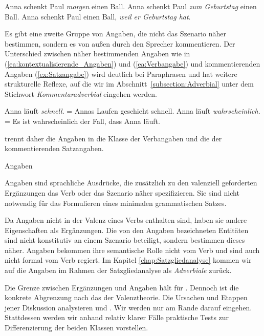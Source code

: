 \ea \label{ea:kontextualisierende_Angaben}
\ea \label{ea:Adverb} Anna schenkt Paul \textit{morgen} einen Ball.
\ex \label{ex:PP} Anna schenkt Paul \textit{zum Geburtstag} einen Ball.
\ex \label{ex:NeSa} Anna schenkt Paul einen Ball, \textit{weil er Geburtstag hat}.
\z 
\z 

Es gibt eine zweite Gruppe von Angaben, die nicht das Szenario näher bestimmen, sondern es von außen durch den Sprecher kommentieren. Der Unterschied zwischen näher bestimmenden Angaben wie in (\ref{ea:kontextualisierende_Angaben}) und (\ref{ea:Verbangabe}) und kommentierenden Angaben (\ref{ex:Satzangabe}) wird deutlich bei Paraphrasen und hat weitere strukturelle Reflexe, auf die wir im Abschnitt~\ref{subsection:Adverbial} unter dem Stichwort \textit{Kommentaradverbial} eingehen werden.  

\ea
\ea \label{ea:Verbangabe} Anna läuft \textit{schnell}. = Annas Laufen geschieht schnell.
\ex \label{ex:Satzangabe} Anna läuft \textit{wahrscheinlich}. = Es ist wahrscheinlich der Fall, dass Anna läuft. 
\z
\z 

\citet[222--223]{Eroms2000} trennt daher die Angaben in die Klasse der Verbangaben und die der kommentierenden Satzangaben. 


\begin{Definition}{Angaben}
    
\noindent Angaben sind sprachliche Ausdrücke, die zusätzlich zu den valenziell geforderten Ergänzungen das Verb oder das Szenario näher spezifizieren. Sie sind nicht notwendig für das Formulieren eines minimalen grammatischen Satzes. 
\end{Definition}



Da Angaben nicht in der Valenz eines Verbs enthalten sind, haben sie andere Eigenschaften als Ergänzungen. Die von den Angaben bezeichneten Entitäten sind nicht konstitutiv an einem Szenario beteiligt, sondern bestimmen dieses näher. Angaben bekommen ihre semantische Rolle nicht vom Verb und sind auch nicht formal vom Verb regiert. Im Kapitel \ref{chap:Satzgliedanalyse} kommen wir auf die Angaben im Rahmen der Satzgliedanalyse als \textit{Adverbiale} zurück. 

Die Grenze zwischen Ergänzungen und Angaben hält \citet[36]{Helbig1982b} für . Dennoch ist die konkrete Abgrenzung nach \citet[167]{Agel2000} das  der Valenztheorie. Die Ursachen und Etappen jener Diskussion analysieren \citet[Kap. 7]{Agel2000} und \citet[Kap. 3]{Welke2011}. Wir werden nur am Rande darauf eingehen. Stattdessen werden wir anhand relativ klarer Fälle praktische Tests zur Differenzierung der beiden Klassen vorstellen. 


